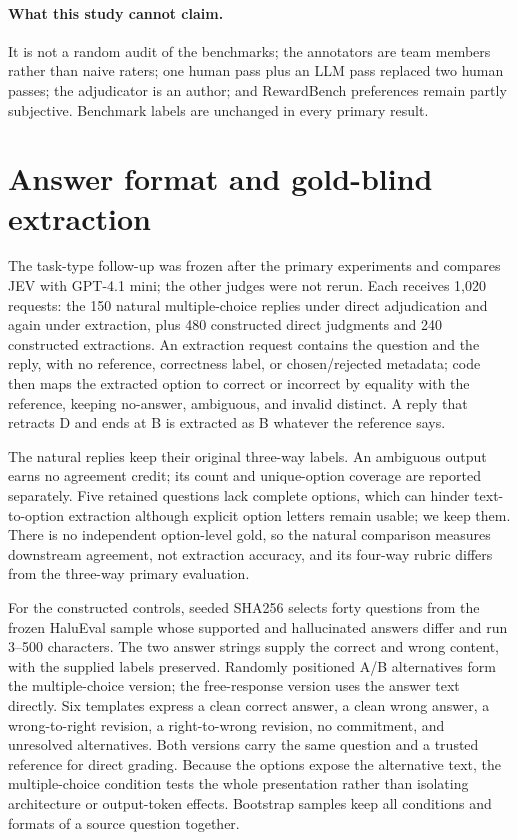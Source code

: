 \documentclass[11pt]{article}
\begin{document}
\paragraph{What this study cannot claim.}
It is not a random audit of the benchmarks; the annotators are team members rather than naive raters; one human pass plus an LLM pass replaced two human passes; the adjudicator is an author; and RewardBench preferences remain partly subjective. Benchmark labels are unchanged in every primary result.

\section{Answer format and gold-blind extraction}
\label{app:tasktypes}
The task-type follow-up was frozen after the primary experiments and compares JEV with GPT-4.1 mini; the other judges were not rerun. Each receives 1,020 requests: the 150 natural multiple-choice replies under direct adjudication and again under extraction, plus 480 constructed direct judgments and 240 constructed extractions. An extraction request contains the question and the reply, with no reference, correctness label, or chosen/rejected metadata; code then maps the extracted option to correct or incorrect by equality with the reference, keeping no-answer, ambiguous, and invalid distinct. A reply that retracts D and ends at B is extracted as B whatever the reference says.

The natural replies keep their original three-way labels. An ambiguous output earns no agreement credit; its count and unique-option coverage are reported separately. Five retained questions lack complete options, which can hinder text-to-option extraction although explicit option letters remain usable; we keep them. There is no independent option-level gold, so the natural comparison measures downstream agreement, not extraction accuracy, and its four-way rubric differs from the three-way primary evaluation.

For the constructed controls, seeded SHA256 selects forty questions from the frozen HaluEval sample whose supported and hallucinated answers differ and run 3--500 characters. The two answer strings supply the correct and wrong content, with the supplied labels preserved. Randomly positioned A/B alternatives form the multiple-choice version; the free-response version uses the answer text directly. Six templates express a clean correct answer, a clean wrong answer, a wrong-to-right revision, a right-to-wrong revision, no commitment, and unresolved alternatives. Both versions carry the same question and a trusted reference for direct grading. Because the options expose the alternative text, the multiple-choice condition tests the whole presentation rather than isolating architecture or output-token effects. Bootstrap samples keep all conditions and formats of a source question together.
\end{document}
